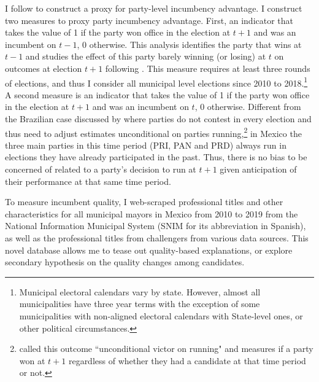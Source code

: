 \documentclass[12pt]{amsart}
\makeatletter
\def\section{\@startsection{section}{1}
	\z@{1.0\linespacing\@plus\linespacing}{.5\linespacing}{\Large}}
\numberwithin{equation}{section}
\theoremstyle{definition}
\theoremstyle{definition}
\theoremstyle{definition}
\makeatother
\begin{document}
I follow \citet{klasnja_titiunik_2017} to construct  a proxy for party-level incumbency advantage. %
I construct two measures to proxy party incumbency advantage. First, an indicator that takes the value of 1 if the party won office in the election at $t+1$ and was an incumbent on $t-1$, 0 otherwise. This analysis identifies the party that wins at $t-1$ and studies the effect of this party barely winning (or losing) at $t$ on outcomes at election $t+1$ following \citet{klasnja_titiunik_2017}. This measure requires at least three rounds of elections, and thus I consider all municipal level elections since 2010 to 2018.\footnote{Municipal electoral calendars vary by state. However, almost all municipalities have three year terms with the exception of some municipalities with non-aligned electoral calendars with State-level ones, or other political circumstances.} A second measure is an indicator that takes the value of 1 if the party won office in the election at $t+1$ and was an incumbent on $t$, 0 otherwise. Different from the Brazilian case discussed by \citet{klasnja_titiunik_2017} where parties do not contest in every election and thus need to adjust estimates unconditional on parties running,\footnote{\citet{klasnja_titiunik_2017} called this outcome ``unconditional victor on running" and measures if a party won at $t+1$ regardless of whether they had a candidate at that time period or not.} in Mexico the three main parties in this time period (PRI, PAN and PRD) always run in elections they have already participated in the past. Thus, there is no bias to be concerned of related to a party's decision to run at $t+1$ given anticipation of their performance at that same time period.  

To measure incumbent quality, I web-scraped professional titles and other characteristics for all municipal mayors in Mexico from 2010 to 2019 from the National Information Municipal System (SNIM for its abbreviation in Spanish), as well as the professional titles from challengers from various data sources. This novel database allows me to tease out quality-based explanations, or explore secondary hypothesis on the quality changes among candidates.

\section{Main Results}
\end{document}
